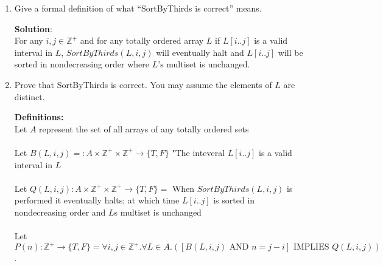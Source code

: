 \documentclass[11pt]{article}
\def\ints {{\mathbb Z}}
\newcommand{\Implies}{\mbox{ IMPLIES }}
\newcommand{\And}{\mbox{ AND }}
\begin{document}
\begin{enumerate}
\begin{solution}
\end{solution}


\item
\begin{question}
Give a formal definition of what ``SortByThirds is correct'' means.
\end{question}

\begin{solution}
{\bf Solution}:\\
For any $i, j\in \ints^+$ and for any totally ordered array $L$ if $L[i..j]$ is a valid interval in $L$, $SortByThirds(L, i, j)$ will eventually halt and $L[i..j]$ will be sorted in nondecreasing order where $L$'s multiset is unchanged.
\end{solution}

\item
\begin{question}
Prove that SortByThirds is correct.
You may assume the elements of $L$ are distinct.
\end{question}

\begin{solution}
{\bf Definitions:}\\
Let $A$ represent the set of all arrays of any totally ordered sets\\\\
Let $B(L, i, j) = : A\times \ints^+\times\ints^+ \rightarrow \{T,F\}  $ "The inteveral $L[i..j]$ is a valid interval in $L$\\\\
Let $Q(L, i, j): A\times \ints^+\times\ints^+ \rightarrow \{T,F\}  = $ When $SortByThirds(L, i, j)$ is performed it eventually halts; at which time $L[i..j]$ is sorted in nondecreasing order and $L$s multiset is unchanged\\\\
Let $P(n): \ints^+ \rightarrow \{T,F\} = \forall i,j\in\ints^+.\forall L\in A.\left([B(L, i, j)\And n=j-i]\Implies Q(L, i, j)\right)$.


\end{solution}
\end{enumerate}
\end{document}
